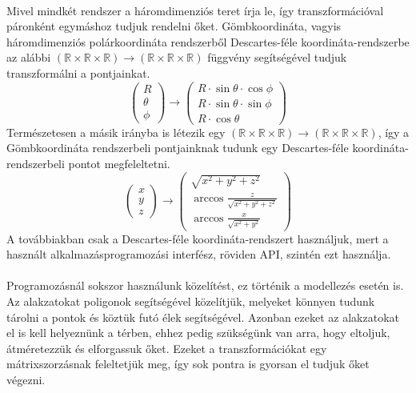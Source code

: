 \documentclass[12pt]{report}
\begin{document}
\paragraph{}
Mivel mindkét rendszer a háromdimenziós teret írja le, így transzformációval páronként egymáshoz tudjuk rendelni őket.
Gömbkoordináta, vagyis háromdimenziós polárkoordináta rendszerből Descartes-féle koordináta-rendszerbe az alábbi $(\mathbb{R} \times \mathbb{R} \times \mathbb{R}) \rightarrow (\mathbb{R} \times \mathbb{R} \times \mathbb{R})$ függvény segítségével tudjuk transzformálni a pontjainkat.
$$
\left( \begin{array}{c}
	R \\
	\theta \\
	\phi \end{array}
\right)
\rightarrow
\left( \begin{array}{c}
	R \cdot \sin \theta \cdot \cos \phi \\
	R \cdot \sin \theta \cdot \sin \phi \\
	R \cdot \cos \theta
\end{array} \right)
$$
Természetesen a másik irányba is létezik egy $(\mathbb{R} \times \mathbb{R} \times \mathbb{R}) \rightarrow (\mathbb{R} \times \mathbb{R} \times \mathbb{R})$, így a Gömbkoordináta rendszerbeli pontjainknak tudunk egy Descartes-féle koordináta-rendszerbeli pontot megfeleltetni.
$$
\left( \begin{array}{c}
	x \\
	y \\
	z \end{array}
\right)
\rightarrow
\left( \begin{array}{c}
	\sqrt{x^2+y^2+z^2} \\
	\arccos{\frac{z}{\sqrt{x^2+y^2+z^2}}} \\
	\arccos{\frac{x}{\sqrt{x^2+y^2}}}
\end{array} \right)
$$
A továbbiakban csak a Descartes-féle koordináta-rendszert használjuk, mert a használt alkalmazásprogramozási interfész, röviden API, szintén ezt használja.
\paragraph{}
Programozásnál sokszor használunk közelítést, ez történik a modellezés esetén is. Az alakzatokat poligonok segítségével közelítjük, melyeket könnyen tudunk tárolni a pontok és köztük futó élek segítségével. Azonban ezeket az alakzatokat el is kell helyeznünk a térben, ehhez pedig szükségünk van arra, hogy eltoljuk, átméretezzük és elforgassuk őket. Ezeket a transzformációkat egy mátrixszorzásnak feleltetjük meg, így sok pontra is gyorsan el tudjuk őket végezni.
\end{document}
